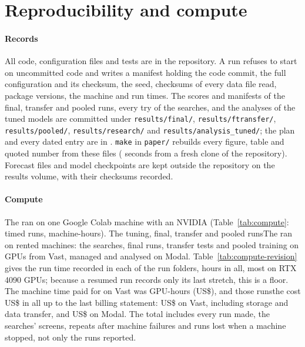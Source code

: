 \section{Reproducibility and compute}
\label{sec:repro}

\paragraph{Records}
All code, configuration files and tests are in the repository. A run refuses to
start on uncommitted code and writes a manifest holding the code commit, the
full configuration and its checksum, the seed, checksums of every data file
read, package versions, the machine and run times. The scores and manifests of
the final, transfer and pooled runs, every try of the searches, and the
analyses of the tuned models are committed under \nolinkurl{results/final/},
\nolinkurl{results/ftransfer/}, \nolinkurl{results/pooled/},
\nolinkurl{results/research/} and \nolinkurl{results/analysis_tuned/}; the plan
and every dated entry are in .
\texttt{make} in \texttt{paper/} rebuilds every figure, table and quoted number
from these files (\buildSeconds{} seconds from a fresh clone of the repository). Forecast files and model checkpoints are kept outside the
repository on the results volume, with their checksums recorded.

\paragraph{Compute}
The \firstver{} ran on one Google Colab machine with an NVIDIA \computeGpu{}
(Table~\ref{tab:compute}: \computeRuns{} timed runs, \computeHours{}
machine-hours). \ifjournal The tuning, final, transfer and pooled runs\else The \revn{}\fi{} ran on rented machines: the searches, final runs,
transfer tests and pooled training on GPUs from Vast, managed and analysed on
Modal. Table~\ref{tab:compute-revision} gives the run time recorded in each of
the \computeRevRuns{} run folders, \computeRevHours{} hours in all, most on RTX
4090 GPUs; because a resumed run records only its last stretch, this is a floor.
The machine time paid for on Vast was \computeVastGpuHours{} GPU-hours
(US\$\computeVastGpuUsd{}), and \ifjournal those runs\else the \revn{}\fi{} cost US\$\computeTotalUsd{} in all
up to the last billing statement: US\$\computeVastUsd{} on Vast, including
storage and data transfer, and US\$\computeModalUsd{} on Modal. The total
includes every run made, the searches' screens, repeats after machine failures
and runs lost when a machine stopped, not only the runs reported.



